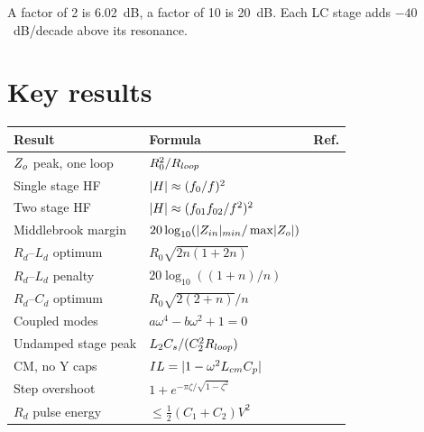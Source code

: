 A factor of 2 is 6.02~dB, a factor of 10 is 20~dB. Each LC stage adds
$-40$~dB/decade above its resonance.

\section{Key results}

\begin{center}
	\small
	\renewcommand{\arraystretch}{1.6}
	\begin{tabular}{@{}lll@{}}
		\toprule
		Result                         & Formula                                                                     & Ref.                       \\
		\midrule
		$Z_o$ peak, one loop           & $R_0^2/R_{loop}$                                                              & \zcref[noname]{eq:zo-peak} \\
		Single stage HF                & $\lvert H\rvert \approx (f_0/f)^2$                                                 &                            \\
		Two stage HF                   & $\lvert H\rvert \approx (f_{01}f_{02}/f^2)^2$                                      & \zcref[noname]{eq:hf-two-stage} \\
		Middlebrook margin             & $20\log_{10}(\lvert Z_{in}\rvert_{min}/\max\lvert Z_o\rvert)$                               & \zcref[noname]{eq:middlebrook} \\
		$R_d$--$L_d$ optimum           & $R_0\sqrt{2n(1+2n)}$                                                        & \zcref[noname]{eq:rd-ld-opt} \\
		$R_d$--$L_d$ penalty           & $20\log_{10}((1+n)/n)$                                                      & \zcref[noname]{eq:lhf}     \\
		$R_d$--$C_d$ optimum           & $R_0\sqrt{2(2+n)}/n$                                                        & \zcref[noname]{eq:rd-cd-opt} \\
		Coupled modes                  & $a\omega^4 - b\omega^2 + 1 = 0$                                             & \zcref[noname]{eq:modes}   \\
		Undamped stage peak            & $L_2C_s/(C_2^2R_{loop})$                                                      & \zcref[noname]{eq:zo-hi}   \\
		CM, no Y caps                  & $IL = \lvert1 - \omega^2L_{cm}C_p\rvert$                                          &                            \\
		Step overshoot                 & $1 + e^{-\pi\zeta/\sqrt{1-\zeta^2}}$                                        &                            \\
		$R_d$ pulse energy             & $\leq \tfrac{1}{2}(C_1+C_2)V^2$                                             &                            \\
		\bottomrule
	\end{tabular}
\end{center}

